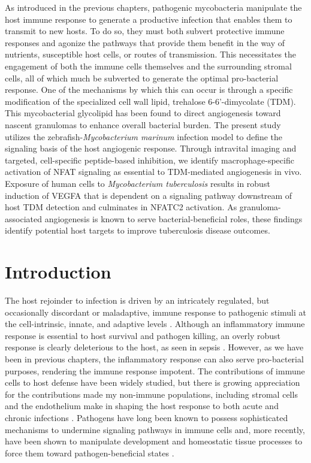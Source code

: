 As introduced in the previous chapters, pathogenic mycobacteria manipulate the host immune response to generate a productive infection that enables them to transmit to new hosts. To do so, they must both subvert protective immune responses and agonize the pathways that provide them benefit in the way of nutrients, susceptible host cells, or routes of transmission. This necessitates the engagement of both the immune cells themselves and the surrounding stromal cells, all of which much be subverted to generate the optimal pro-bacterial response. One of the mechanisms by which this can occur is through a specific modification of the specialized cell wall lipid, trehalose 6-6'-dimycolate (TDM). This mycobacterial glycolipid has been found to direct angiogenesis toward nascent granulomas to enhance overall bacterial burden. The present study utilizes the zebrafish-\textit{Mycobacterium marinum} infection model to define the signaling basis of the host angiogenic response. Through intravital imaging and targeted, cell-specific peptide-based inhibition, we identify macrophage-specific activation of NFAT signaling as essential to TDM-mediated angiogenesis in vivo.  Exposure of human cells to \textit{Mycobacterium tuberculosis} results in robust induction of VEGFA that is dependent on a signaling pathway downstream of host TDM detection and culminates in NFATC2 activation. As granuloma-associated angiogenesis is known to serve bacterial-beneficial roles, these findings identify potential host targets to improve tuberculosis disease outcomes.

\section{Introduction}

The host rejoinder to infection is driven by an intricately regulated, but occasionally discordant or maladaptive, immune response to pathogenic stimuli at the cell-intrinsic, innate, and adaptive levels \citep{Iwasaki2010, Finlay2006, Haldar2015, MacMicking2004, MacMicking2012, Kim2012}. Although an inflammatory immune response is essential to host survival and pathogen killing, an overly robust response is clearly deleterious to the host, as seen in sepsis \citep{Finethy2020}. However, as we have been in previous chapters, the inflammatory response can also serve pro-bacterial purposes, rendering the immune response impotent. The contributions of immune cells to host defense have been widely studied, but there is growing appreciation for the contributions made my non-immune populations, including stromal cells and the endothelium \citep{Honan2021, Worrell2021, Amersfoort2022, Honan2021} make in shaping the host response to both acute and chronic infections \citep{Mueller2009, Randow2013, Krishnamurty2020}. Pathogens have long been known to possess sophisticated mechanisms to undermine signaling pathways in immune cells and, more recently, have been shown to manipulate development and homeostatic tissue processes to force them toward pathogen-beneficial states \citep{Menzies1998, Guichard2013}.


